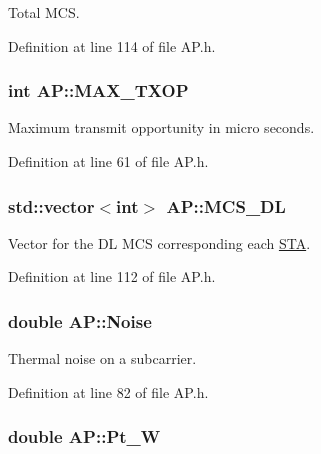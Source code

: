 Total M\-C\-S. 



Definition at line 114 of file A\-P.\-h.

\hypertarget{classAP_a0952981af3bebf7dcc9fabe94875dc7b}{
\subsubsection[{M\-A\-X\-\_\-\-T\-X\-O\-P}]{\setlength{\rightskip}{0pt plus 5cm}int A\-P\-::\-M\-A\-X\-\_\-\-T\-X\-O\-P\hspace{0.3cm}{\ttfamily [private]}}}\label{classAP_a0952981af3bebf7dcc9fabe94875dc7b}


Maximum transmit opportunity in micro seconds. 



Definition at line 61 of file A\-P.\-h.

\hypertarget{classAP_a7b8604e8bed67e0abef14f54ba55ec19}{
\subsubsection[{M\-C\-S\-\_\-\-D\-L}]{\setlength{\rightskip}{0pt plus 5cm}std\-::vector$<$int$>$ A\-P\-::\-M\-C\-S\-\_\-\-D\-L}}\label{classAP_a7b8604e8bed67e0abef14f54ba55ec19}


Vector for the D\-L M\-C\-S corresponding each \hyperlink{classSTA}{S\-T\-A}. 



Definition at line 112 of file A\-P.\-h.

\hypertarget{classAP_ae865c89ed6f1bace113d6ddb1a4f41d3}{
\subsubsection[{Noise}]{\setlength{\rightskip}{0pt plus 5cm}double A\-P\-::\-Noise\hspace{0.3cm}{\ttfamily [private]}}}\label{classAP_ae865c89ed6f1bace113d6ddb1a4f41d3}


Thermal noise on a subcarrier. 



Definition at line 82 of file A\-P.\-h.

\hypertarget{classAP_a10998008dbe6e924211af8d9ee155534}{
\subsubsection[{Pt\-\_\-\-W}]{\setlength{\rightskip}{0pt plus 5cm}double A\-P\-::\-Pt\-\_\-\-W}}\label{classAP_a10998008dbe6e924211af8d9ee155534}


